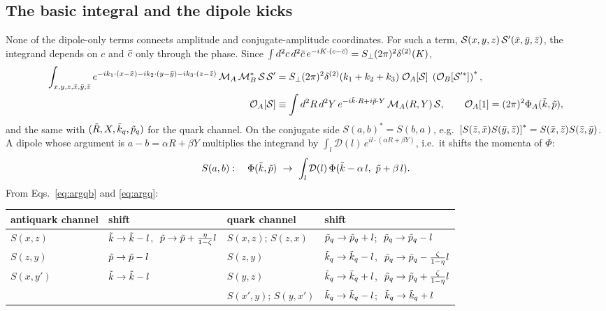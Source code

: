 \documentclass[9pt]{article}
\numberwithin{equation}{section}
\begin{document}
\subsection{The basic integral and the dipole kicks}
None of the dipole-only terms connects amplitude and conjugate-amplitude coordinates. For such a term, $\mathcal{S}(x,y,z)\,\mathcal{S}'(\Bar{x},\Bar{y},\Bar{z})$, the integrand depends on $c$ and $\Bar{c}$ only through the phase. Since $\int d^{2}c\,d^{2}\Bar{c}\,e^{-iK\cdot(c-\Bar{c})} = S_{\perp}(2\pi)^{2}\delta^{(2)}(K)$,
\begin{align}\label{eq:lemma}
    \int_{x,y,z,\Bar{x},\Bar{y},\Bar{z}} e^{-ik_{1}\cdot(x-\Bar{x})-ik_{2}\cdot(y-\Bar{y})-ik_{3}\cdot(z-\Bar{z})}\,\mathcal{M}_{A}\,\mathcal{M}^{*}_{B}\,\mathcal{S}\,\mathcal{S}' & = S_{\perp}(2\pi)^{2}\delta^{(2)}(k_{1}+k_{2}+k_{3})\;\mathcal{O}_{A}[\mathcal{S}]\;\left(\mathcal{O}_{B}[\mathcal{S}'^{*}]\right)^{*},\notag \\
    \mathcal{O}_{A}[\mathcal{S}] & \equiv \int d^{2}R\,d^{2}Y\,e^{-i\Tilde{k}\cdot R+i\Tilde{p}\cdot Y}\,\mathcal{M}_{A}(R,Y)\,\mathcal{S},\hspace{2em}\mathcal{O}_{A}[1]=(2\pi)^{2}\Phi_{A}(\Tilde{k},\Tilde{p}),
\end{align}
and the same with $(\Tilde{R},X,\Tilde{k}_{q},\Tilde{p}_{q})$ for the quark channel. On the conjugate side $S(a,b)^{*}=S(b,a)$, e.g.\ $\left[S(\Bar{z},\Bar{x})S(\Bar{y},\Bar{z})\right]^{*}=S(\Bar{x},\Bar{z})S(\Bar{z},\Bar{y})$. A dipole whose argument is $a-b=\alpha R+\beta Y$ multiplies the integrand by $\int_{l}\mathcal{D}(l)\,e^{il\cdot(\alpha R+\beta Y)}$, i.e.\ it shifts the momenta of $\Phi$:
\begin{align}
    S(a,b):\hspace{1em}\Phi(\Tilde{k},\Tilde{p})\ \rightarrow\ \int_{l}\mathcal{D}(l)\,\Phi(\Tilde{k}-\alpha\,l,\ \Tilde{p}+\beta\,l).
\end{align}
From Eqs.~\eqref{eq:argqb} and \eqref{eq:argq}:
\begin{center}
\renewcommand{\arraystretch}{1.3}
\begin{tabular}{||l|l||l|l||}
\hline
antiquark channel & shift & quark channel & shift \\
\hline\hline
$S(x,z)$ & $\Tilde{k}\rightarrow\Tilde{k}-l$, $\ \Tilde{p}\rightarrow\Tilde{p}+\frac{\eta}{1-\zeta}l$ & $S(x,z)$; $S(z,x)$ & $\Tilde{p}_{q}\rightarrow\Tilde{p}_{q}+l$; $\ \Tilde{p}_{q}\rightarrow\Tilde{p}_{q}-l$ \\
$S(z,y)$ & $\Tilde{p}\rightarrow\Tilde{p}-l$ & $S(z,y)$ & $\Tilde{k}_{q}\rightarrow\Tilde{k}_{q}-l$, $\ \Tilde{p}_{q}\rightarrow\Tilde{p}_{q}-\frac{\zeta}{1-\eta}l$ \\
$S(x,y')$ & $\Tilde{k}\rightarrow\Tilde{k}-l$ & $S(y,z)$ & $\Tilde{k}_{q}\rightarrow\Tilde{k}_{q}+l$, $\ \Tilde{p}_{q}\rightarrow\Tilde{p}_{q}+\frac{\zeta}{1-\eta}l$ \\
 & & $S(x',y)$; $S(y,x')$ & $\Tilde{k}_{q}\rightarrow\Tilde{k}_{q}-l$; $\ \Tilde{k}_{q}\rightarrow\Tilde{k}_{q}+l$ \\
\hline
\end{tabular}
\end{center}
\end{document}
